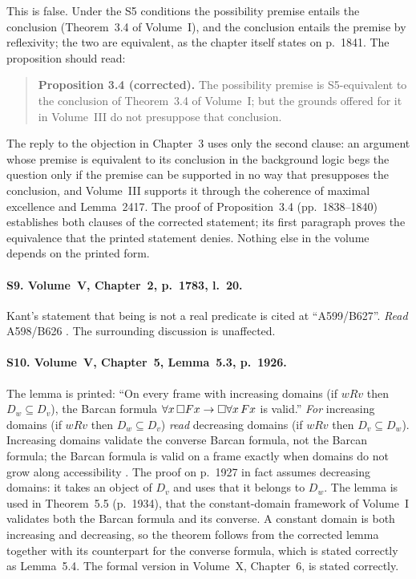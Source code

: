 \documentclass{situationist-preprint}
\begin{document}
This is false. Under the S5 conditions the possibility premise entails the conclusion (Theorem~3.4 of Volume~I), and the conclusion entails the premise by reflexivity; the two are equivalent, as the chapter itself states on p.~1841. The proposition should read:

\begin{quote}\small
\textbf{Proposition 3.4 (corrected).} The possibility premise is S5-equivalent to the conclusion of Theorem~3.4 of Volume~I; but the grounds offered for it in Volume~III do not presuppose that conclusion.
\end{quote}

The reply to the objection in Chapter~3 uses only the second clause: an argument whose premise is equivalent to its conclusion in the background logic begs the question only if the premise can be supported in no way that presupposes the conclusion, and Volume~III supports it through the coherence of maximal excellence and Lemma~2417. The proof of Proposition~3.4 (pp.~1838--1840) establishes both clauses of the corrected statement; its first paragraph proves the equivalence that the printed statement denies. Nothing else in the volume depends on the printed form.

\paragraph{S9. Volume~V, Chapter~2, p.~1783, l.~20.} Kant's statement that being is not a real predicate is cited at \enquote{A599/B627}. \textit{Read} A598/B626 \citep{Kant}. The surrounding discussion is unaffected.

\paragraph{S10. Volume~V, Chapter~5, Lemma~5.3, p.~1926.} The lemma is printed: \enquote{On every frame with increasing domains (if $wRv$ then $D_w \subseteq D_v$), the Barcan formula $\forall x\,\mathord{\Box} Fx \to \mathord{\Box}\forall x\,Fx$ is valid.} \textit{For} increasing domains (if $wRv$ then $D_w \subseteq D_v$) \textit{read} decreasing domains (if $wRv$ then $D_v \subseteq D_w$). Increasing domains validate the converse Barcan formula, not the Barcan formula; the Barcan formula is valid on a frame exactly when domains do not grow along accessibility \citep{HughesCresswell1996}. The proof on p.~1927 in fact assumes decreasing domains: it takes an object of $D_v$ and uses that it belongs to $D_w$. The lemma is used in Theorem~5.5 (p.~1934), that the constant-domain framework of Volume~I validates both the Barcan formula and its converse. A constant domain is both increasing and decreasing, so the theorem follows from the corrected lemma together with its counterpart for the converse formula, which is stated correctly as Lemma~5.4. The formal version in Volume~X, Chapter~6, is stated correctly.
\end{document}

